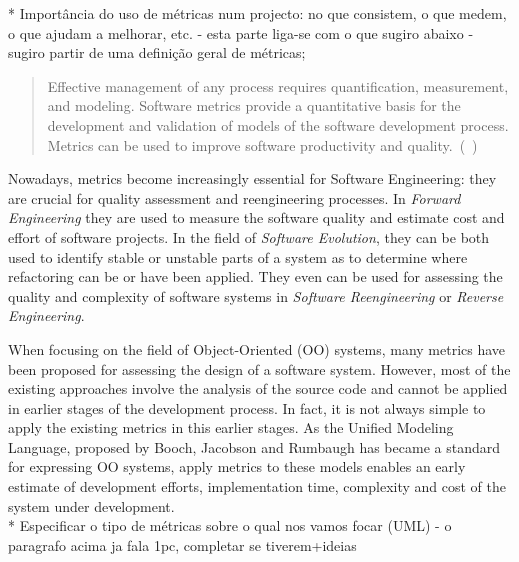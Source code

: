 
    * Importância do uso de métricas num projecto: no que consistem, o que medem, o que ajudam a melhorar, etc. - esta parte liga-se com o que sugiro abaixo - sugiro partir de uma definição geral de métricas;\\

\begin{quotation}
Effective management of any process requires quantification, measurement, and modeling. Software metrics provide a quantitative basis for the development and validation of models of the software development process. Metrics can be used to improve software productivity and quality.~(\cite{g1:Millis:1998}~)
\end{quotation}
    
Nowadays, metrics become increasingly essential for Software Engineering: they are crucial for quality assessment and reengineering processes.
In \emph{Forward Engineering} they are used to measure the software quality and estimate cost and effort of software projects\cite{Fenton}.
In the field of \emph{Software Evolution}, they can be both used to identify stable or unstable parts of a system as to determine where refactoring can be or have been applied\cite{Serge}.
They even can be used for assessing the quality and complexity of software systems in \emph{Software Reengineering} or \emph{Reverse Engineering}\cite{43044}.

When focusing on the field of Object-Oriented (OO) systems, many metrics have been proposed for assessing the design of a software system.
However, most of the existing approaches involve the analysis of the source code and cannot be applied in earlier stages of the development process.
In fact, it is not always simple to apply the existing metrics in this earlier stages. 
As the \textsf{Unified Modeling Language}, proposed by Booch, Jacobson and Rumbaugh\cite{USDPuml} has became a standard for expressing OO systems, apply metrics to these models enables an early estimate of development efforts, implementation time, complexity and cost of the system under development. \\

  * Especificar o tipo de métricas sobre o qual nos vamos focar (UML) - o paragrafo acima ja fala 1pc, completar se tiverem+ideias\\
  
